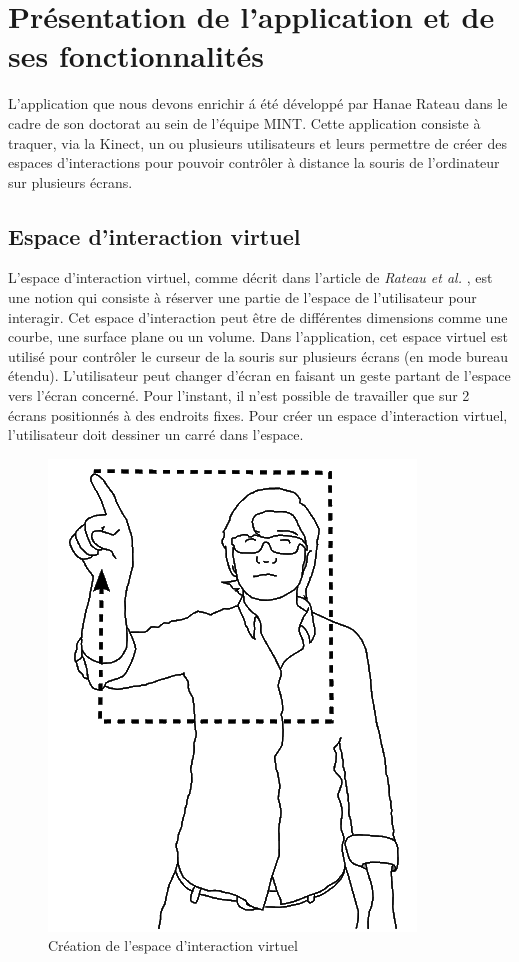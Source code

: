 \chapter{Présentation de l’application et de ses fonctionnalités}

L’application que nous devons enrichir á été développé par Hanae Rateau dans le cadre de son doctorat au sein de l’équipe MINT. Cette application consiste à traquer, via la Kinect, un ou plusieurs utilisateurs et leurs permettre de créer des espaces d’interactions pour pouvoir contrôler à distance la souris de l’ordinateur sur plusieurs écrans.

\section{Espace d’interaction virtuel}

L’espace d’interaction virtuel, comme décrit dans l'article de \textit{Rateau et al.} \cite{rateau:hal-00851935},  est une notion qui consiste à réserver une partie de l’espace de l’utilisateur pour interagir. Cet espace d’interaction peut être de différentes dimensions comme une courbe, une surface plane ou un volume.  Dans l’application, cet espace virtuel est utilisé pour contrôler le curseur de la souris sur plusieurs écrans (en mode bureau étendu). L’utilisateur peut changer d’écran en faisant un geste partant de l’espace vers l’écran concerné. Pour l’instant, il n’est possible de travailler que sur 2 écrans positionnés à des endroits fixes. Pour créer un espace d’interaction virtuel, l’utilisateur doit dessiner un carré dans l’espace. 
	 
\begin{figure}[!ht]
	\center	
	\includegraphics[scale=0.2]{image/create.png}
	\caption{Création de l'espace d'interaction virtuel}
\end{figure}


